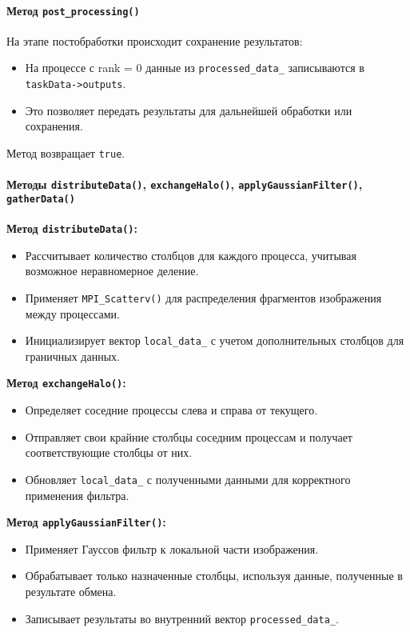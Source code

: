 \documentclass[12pt]{article}
\begin{document}
\paragraph{Метод \texttt{post\_processing()}}
На этапе постобработки происходит сохранение результатов:
\begin{itemize}
    \item На процессе с rank = 0 данные из \texttt{processed\_data\_} записываются в \texttt{taskData->outputs}.
    \item Это позволяет передать результаты для дальнейшей обработки или сохранения.
\end{itemize}
Метод возвращает \texttt{true}.

\paragraph{Методы \texttt{distributeData()}, \texttt{exchangeHalo()}, \texttt{applyGaussianFilter()}, \texttt{gatherData()}}
\textbf{Метод \texttt{distributeData()}:}
\begin{itemize}
    \item Рассчитывает количество столбцов для каждого процесса, учитывая возможное неравномерное деление.
    \item Применяет \texttt{MPI\_Scatterv()} для распределения фрагментов изображения между процессами.
    \item Инициализирует вектор \texttt{local\_data\_} с учетом дополнительных столбцов для граничных данных.
\end{itemize}

\textbf{Метод \texttt{exchangeHalo()}:}
\begin{itemize}
    \item Определяет соседние процессы слева и справа от текущего.
    \item Отправляет свои крайние столбцы соседним процессам и получает соответствующие столбцы от них.
    \item Обновляет \texttt{local\_data\_} с полученными данными для корректного применения фильтра.
\end{itemize}

\textbf{Метод \texttt{applyGaussianFilter()}:}
\begin{itemize}
    \item Применяет Гауссов фильтр к локальной части изображения.
    \item Обрабатывает только назначенные столбцы, используя данные, полученные в результате обмена.
    \item Записывает результаты во внутренний вектор \texttt{processed\_data\_}.
\end{itemize}
\end{document}
